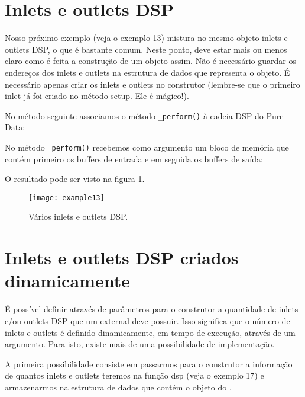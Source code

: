 \section{Inlets e outlets DSP}

Nosso próximo exemplo (veja o exemplo 13) mistura no mesmo objeto inlets e
outlets DSP, o que é bastante comum. Neste ponto, deve estar mais ou menos
claro como é feita a construção de um objeto assim. Não é necessário guardar 
os endereços dos inlets e outlets na estrutura de dados que representa o objeto. 
É necessário apenas criar os inlets e outlets no construtor (lembre-se que o 
primeiro inlet já foi criado no método setup. Ele é mágico!).



No método seguinte associamos o método \texttt{\_perform()} à cadeia DSP do
Pure Data:



No método \texttt{\_perform()} recebemos como argumento um bloco de memória
que contém primeiro os buffers de entrada e em seguida os buffers de saída:



O resultado pode ser visto na figura \ref{fig:varios-inlets-outlets}.

\begin{figure}[h!]
\centering
\texttt{[image: example13]}
\caption{Vários inlets e outlets DSP.}
\label{fig:varios-inlets-outlets}
\end{figure}

\section{Inlets e outlets DSP criados dinamicamente}

É possível definir através de parâmetros para o construtor a quantidade de
inlets e/ou outlets DSP que um external deve possuir. Isso significa que o
número de inlets e outlets é definido dinamicamente, em tempo de execução,
através de um argumento. Para isto, existe mais de uma possibilidade de
implementação.

A primeira possibilidade consiste em passarmos para o construtor a informação
de quantos inlets e outlets teremos na função dsp (veja o exemplo
17) e armazenarmos na estrutura de dados que contém o objeto do \external.

